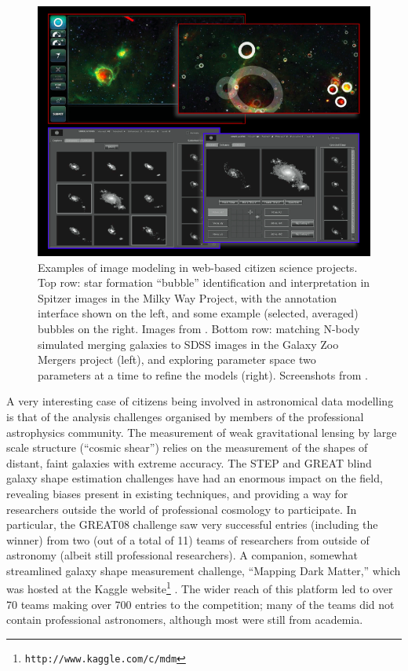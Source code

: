 \documentclass{ar2e}
\begin{document}
\begin{figure}[!ht]
\centering\includegraphics[width=\linewidth]{figs/modeling.png}
\caption{Examples of image modeling in web-based citizen science projects. Top
row: star formation ``bubble'' identification and interpretation in Spitzer
images in the Milky Way Project, with the annotation interface shown on the
left, and some example (selected, averaged) bubbles on the right. Images from
\citet{SimpsonEtal2012}. Bottom row: matching N-body simulated merging
galaxies to SDSS images in the Galaxy Zoo Mergers project (left), and
exploring parameter space two parameters at a time to refine the models
(right). Screenshots from \citet{HolincheckEtal2010}.}
\label{fig:modeling}
\end{figure}


A very interesting case of citizens being involved in astronomical 
data modelling is that of the analysis challenges organised by members of
the professional astrophysics community. The measurement of weak gravitational
lensing by large scale structure (``cosmic shear'') relies on the measurement
of the shapes of distant, faint galaxies with extreme accuracy. The STEP
\citep{HeymansEtal2006,MasseyEtal2007} and GREAT
\citep{BridleEtal2010,KitchingEtal2012,KitchingEtal2013a} blind galaxy shape
estimation challenges have had an enormous impact on the field, revealing
biases present in existing techniques, and providing a way for researchers
outside the world of professional cosmology to participate. In particular, the
GREAT08 challenge saw very successful entries (including the winner) from two
(out of a total of 11) teams of researchers from outside of astronomy (albeit
still professional researchers). A companion, somewhat streamlined galaxy
shape measurement challenge, ``Mapping Dark Matter,'' which was hosted at the
Kaggle website\footnote{\texttt{http://www.kaggle.com/c/mdm}} 
\citep{KitchingEtal2013b}. The wider reach of this platform led to over 70
teams making over 700 entries to the competition; many of the teams did not
contain professional astronomers, although most were still from academia.
\end{document}
